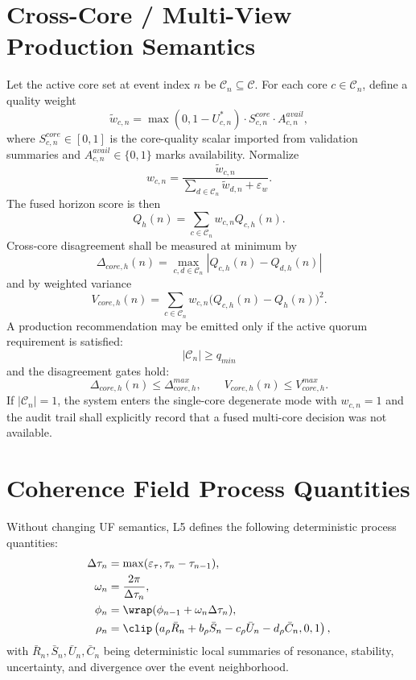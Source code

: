 \section{Cross-Core / Multi-View Production Semantics}

Let the active core set at event index $n$ be $\mathcal{C}_n\subseteq\mathcal{C}$. For each core $c\in\mathcal{C}_n$, define a quality weight
\[
\tilde w_{c,n}=\max(0,1-U^{\ast}_{c,n})\cdot S^{core}_{c,n}\cdot A^{avail}_{c,n},
\]
where $S^{core}_{c,n}\in[0,1]$ is the core-quality scalar imported from validation summaries and $A^{avail}_{c,n}\in\{0,1\}$ marks availability. Normalize
\[
w_{c,n}=\frac{\tilde w_{c,n}}{\sum_{d\in\mathcal{C}_n}\tilde w_{d,n}+\varepsilon_w}.
\]
The fused horizon score is then
\[
Q_h(n)=\sum_{c\in\mathcal{C}_n} w_{c,n}Q_{c,h}(n).
\]
Cross-core disagreement shall be measured at minimum by
\[
\Delta_{core,h}(n)=\max_{c,d\in\mathcal{C}_n}|Q_{c,h}(n)-Q_{d,h}(n)|
\]
and by weighted variance
\[
V_{core,h}(n)=\sum_{c\in\mathcal{C}_n}w_{c,n}\big(Q_{c,h}(n)-Q_h(n)\big)^2.
\]
A production recommendation may be emitted only if the active quorum requirement is satisfied:
\[
|\mathcal{C}_n|\ge q_{min}
\]
and the disagreement gates hold:
\[
\Delta_{core,h}(n)\le \Delta_{core,h}^{max},\qquad V_{core,h}(n)\le V_{core,h}^{max}.
\]
If $|\mathcal{C}_n|=1$, the system enters the single-core degenerate mode with $w_{c,n}=1$ and the audit trail shall explicitly record that a fused multi-core decision was not available.

\section{Coherence Field Process Quantities}

Without changing UF semantics, L5 defines the following deterministic process quantities:
\begin{align*}
\Delta\tau_n &= \max(\varepsilon_\tau,\tau_n-\tau_{n-1}),\\
\omega_n &= \frac{2\pi}{\Delta\tau_n},\\
\phi_n &= \wrap(\phi_{n-1}+\omega_n\Delta\tau_n),\\
\rho_n &= \clip\left(a_\rho\bar R_n+b_\rho\bar S_n-c_\rho\bar U_n-d_\rho\bar C_n,0,1\right),
\end{align*}
with $\bar R_n,\bar S_n,\bar U_n,\bar C_n$ being deterministic local summaries of resonance, stability, uncertainty, and divergence over the event neighborhood.

